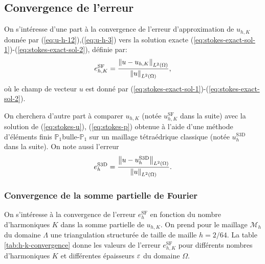 \subsection{Convergence de l'erreur}
On s'intéresse d'une part à la convergence de l'erreur d'approximation
de $u_{h,K}$ donnée par (\ref{eq:u-h-12}),(\ref{eq:u-h-3}) vers la
solution exacte
(\ref{eq:stokes-exact-sol-1})-(\ref{eq:stokes-exact-sol-2}), définie
par:
\begin{equation}
  e_{h,K}^{\mathrm{SF}} =
  \frac{\left\lVert u - u_{h,K} \right\rVert_{L^2(\Omega)}}{\left\lVert u \right\rVert_{L^2(\Omega)}},
\end{equation}
où le champ de vecteur $u$ est donné par
(\ref{eq:stokes-exact-sol-1})-(\ref{eq:stokes-exact-sol-2}).

On cherchera d'autre part à comparer $u_{h,K}$ (notée
$u_{h,K}^{\mathrm{SF}}$ dans la suite) avec la solution de
(\ref{eq:stokes-u}), (\ref{eq:stokes-p}) obtenue à l'aide d'une
méthode d'éléments finis $\mathbb P_1$bulle-$\mathbb P_1$ sur un
maillage tétraédrique classique (notée
$u_h^\mathrm{S3D}$ dans la suite). On note aussi l'erreur
\begin{equation}
  e_h^{\mathrm{S3D}} = \frac{\left\lVert u - u_h^{\mathrm{S3D}} \right\rVert_{L^2(\Omega)}}{\left\lVert u \right\rVert_{L^2(\Omega)}}.
\end{equation}

\subsubsection{Convergence de la somme partielle de Fourier}
On s'intéresse à la convergence de l'erreur $e_h^\mathrm{SF}$ en
fonction du nombre d'harmoniques $K$ dans la somme partielle de
$u_{h,K}$. On prend pour le maillage $\mathcal M_h$ du domaine $\Lambda$
une triangulation structurée de taille de maille $h = 2/64$. La
table \ref{tab:h-k-convergence} donne les valeurs de l'erreur
$e_{h,K}^\mathrm{SF}$ pour différents nombres d'harmoniques $K$ et
différentes épaisseurs $\varepsilon$ du domaine $\Omega$.

